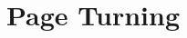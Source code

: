 \documentclass{article}
\begin{document}
    \section{Page Turning}
        \pagebreak[4]
        \enlargethispage{8em}
\end{document}
